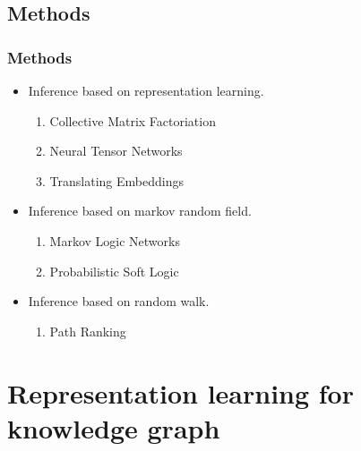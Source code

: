 \documentclass[pdf,10pt]{beamer}
\begin{document}
\subsection{Methods}
\begin{frame}
\frametitle{Methods}
\begin{itemize}
	\item Inference based on representation learning.
		\begin{enumerate}
			\item Collective Matrix Factoriation \citep{nickel2011three}
			\item Neural Tensor Networks \citep{socher2013reasoning}
			\item Translating Embeddings\citep{bordes2013translating}
		\end{enumerate}
	\item Inference based on markov random field.
		\begin{enumerate}
			\item Markov Logic Networks \citep{richardson2006markov}
			\item Probabilistic Soft Logic \citep{brocheler2012probabilistic}
		\end{enumerate}
	\item Inference based on random walk.
		\begin{enumerate}
			\item Path Ranking \citep{lao2011random}
		\end{enumerate}
\end{itemize}
\end{frame}

\section{Representation learning for knowledge graph}
\end{document}
